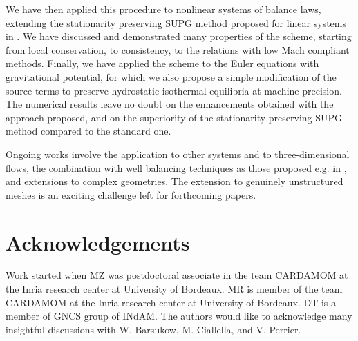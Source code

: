 \documentclass[a4paper,10pt]{article}
\begin{document}
We have then applied this procedure to nonlinear systems of balance laws, extending the stationarity preserving SUPG method proposed for linear systems in \cite{barsukow2025structure,barsukow2025stationaritypreservingnodalfinite}. 
We have discussed and demonstrated many properties 
of the scheme, starting from local conservation, to consistency, to the relations with low Mach compliant methods.
Finally, we have applied the scheme to the Euler equations with gravitational potential, for which we also propose a simple modification
of the source terms to preserve hydrostatic  isothermal equilibria at machine precision.
The numerical results leave no doubt on the  enhancements obtained with the approach proposed,
and on the superiority of the stationarity preserving SUPG method compared to the standard one.

Ongoing works involve the application to other systems and to three-dimensional flows, the
combination with well balancing techniques as those proposed  e.g. in \cite{GOMEZBUENO2021125820}, and extensions to complex geometries. The extension to genuinely unstructured meshes
is an exciting challenge left for forthcoming papers. 
	


\section*{Acknowledgements} 

Work started when MZ was postdoctoral associate in the team CARDAMOM at the  Inria research center at University of Bordeaux. 
MR is member of the team CARDAMOM at the  Inria research center at University of Bordeaux. 
DT is a member of GNCS group of INdAM.
The authors would like to acknowledge many insightful discussions with W. Barsukow, M. Ciallella, and V. Perrier. 


\appendix
\end{document}
